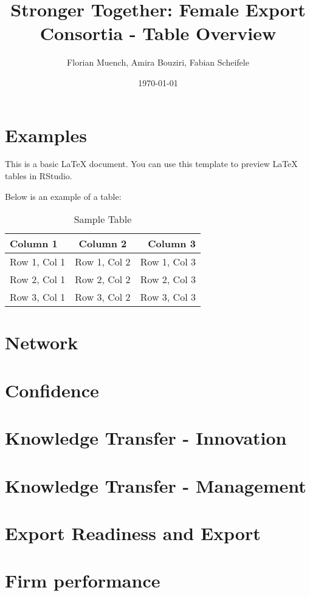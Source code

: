\documentclass{article}
\begin{document}
\title{Stronger Together: Female Export Consortia - Table Overview}
\author{Florian Muench, Amira Bouziri, Fabian Scheifele}
\date{\today}

\maketitle

\section{Examples}

This is a basic LaTeX document. You can use this template to preview LaTeX tables in RStudio.

Below is an example of a table:

\begin{table}[h]
    \centering
    \caption{Sample Table}
    \begin{tabular}{l c r}
        \toprule
        Column 1 & Column 2 & Column 3 \\
        \midrule
        Row 1, Col 1 & Row 1, Col 2 & Row 1, Col 3 \\
        Row 2, Col 1 & Row 2, Col 2 & Row 2, Col 3 \\
        Row 3, Col 1 & Row 3, Col 2 & Row 3, Col 3 \\
        \bottomrule
    \end{tabular}
\end{table}

\section{Network}

\section{Confidence}



\section{Knowledge Transfer - Innovation}

\section{Knowledge Transfer - Management}

\section{Export Readiness and Export}

\section{Firm performance}
\end{document}
